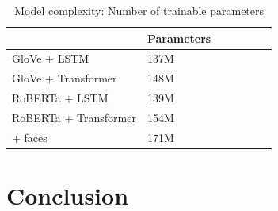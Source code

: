 \documentclass[10pt,twocolumn,letterpaper]{article}
\begin{document}
\begin{table}[t]
	\caption {Model complexity: Number of trainable parameters}
	\label{tab:models}
	\centering
	\begin{tabular}{lllllll}
		\toprule
        & Parameters \\
      \midrule
      GloVe + LSTM & 137M \\
      GloVe + Transformer & 148M \\
      RoBERTa + LSTM & 139M \\
      RoBERTa + Transformer & 154M \\
        + faces & 171M \\
		\bottomrule
	\end{tabular}
\end{table}

\section{Conclusion}

{\small


}
\end{document}
